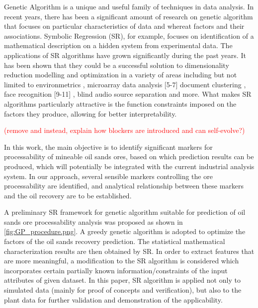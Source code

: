 \documentclass[final,5p,times,twocolumn]{elsarticle}
\begin{document}
Genetic Algorithm is a unique and useful family of techniques in data analysis. In recent years, there has been a significant amount of research on genetic algorithm that focuses on particular characteristics of data and whereat factors and their associations. Symbolic Regression (SR), for example, focuses on identification of a mathematical description on a hidden system from experimental data. The applications of SR algorithms have grown significantly during the past years. It has been shown that they could be a successful solution to dimensionality reduction modelling and optimization in a variety of areas including but not limited to environmetrics \cite{gen2000genetic}, microarray data analysis [5-7] %
document clustering \cite{berry2005email}, face recognition [9-11]%
, blind audio source separation \cite{weninger2012optimization} and more. What makes SR algorithms particularly attractive is the function constraints imposed on the factors they produce, allowing for better interpretability. 


\textcolor{red}{(remove and instead, explain how blockers are introduced and can self-evolve?)}



In this work, the main objective is to identify significant markers for processability of mineable oil sands ores, based on which prediction results can be produced, which will potentially be integrated with the current industrial analysis system. In our approach, several sensible markers controlling the ore processability are identified, and analytical relationship between these markers and the oil recovery are to be established.

A preliminary SR  framework for genetic algorithm suitable for prediction of oil sands ore processability analysis was proposed as shown in \autoref{fig:GP_procedure.png}. A greedy genetic algorithm is adopted   to optimize the factors of the oil sands recovery prediction. The statistical mathematical characterization results are then obtained by SR. In order to extract features that are more meaningful, a modification to the SR algorithm is considered which incorporates certain partially known information/constraints of the input attributes of given dataset. In this paper, SR algorithm is applied not only to simulated data (mainly for proof of concepts and verification), but also to the plant data for further validation and demonstration of the applicability. 
\end{document}
